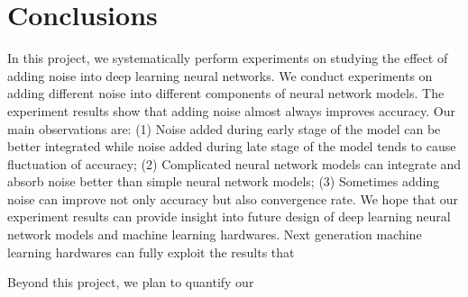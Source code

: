 \section{Conclusions}
\label{sec:conclusions}
In this project, we systematically perform experiments on studying the
effect of adding noise into deep learning neural networks.
We conduct experiments on adding different noise into different components
of neural network models. The experiment results show that adding noise almost always improves accuracy.
Our main observations are:
(1) Noise added during early stage of the model can be better integrated
while noise added during late stage of the model tends to cause
fluctuation of accuracy;
(2) Complicated neural network models can integrate and absorb
noise better than simple neural network models;
(3) Sometimes adding noise can improve not only accuracy but also
convergence rate.
We hope that our experiment results can provide insight into future design
of deep learning neural network models and machine learning hardwares.
Next generation machine learning hardwares can fully exploit the results that


Beyond this project, we plan to quantify our
